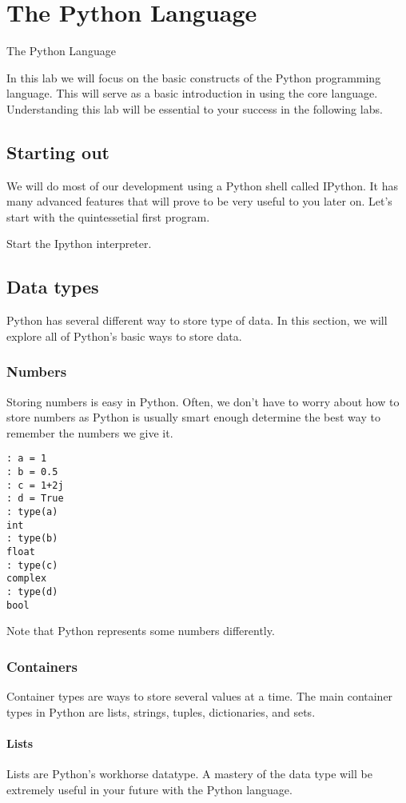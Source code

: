 \chapter{The Python Language}{The Python Language}
\label{Lab:Python}

In this lab we will focus on the basic constructs of the Python programming language.  This will serve as a basic introduction in using the core language.  Understanding this lab will be essential to your success in the following labs.

\section*{Starting out}
We will do most of our development using a Python shell called IPython.  It has many advanced features that will prove to be very useful to you later on.  Let's start with the quintessetial first program.

Start the Ipython interpreter.

\section*{Data types}
Python has several different way to store type of data.  In this section, we will explore all of Python's basic ways to store data.

\subsection*{Numbers}
Storing numbers is easy in Python.  Often, we don't have to worry about how to store numbers as Python is usually smart enough determine the best way to remember the numbers we give it.
\begin{lstlisting}[style=python]
: a = 1
: b = 0.5
: c = 1+2j
: d = True
: type(a)
int
: type(b)
float
: type(c)
complex
: type(d)
bool
\end{lstlisting}
Note that Python represents some numbers differently.

\subsection*{Containers}
Container types are ways to store several values at a time.  The main container types in Python are lists, strings, tuples, dictionaries, and sets.

\subsubsection*{Lists}
Lists are Python's workhorse datatype.  A mastery of the data type will be extremely useful in your future with the Python language.

